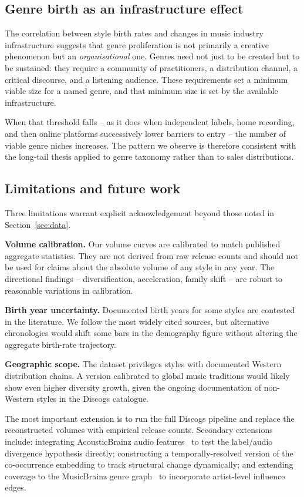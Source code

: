 \documentclass[12pt, a4paper]{article}
\begin{document}
\subsection{Genre birth as an infrastructure effect}

The correlation between style birth rates and changes in music industry
infrastructure suggests that genre proliferation is not primarily
a creative phenomenon but an \emph{organisational} one.
Genres need not just to be created but to be sustained: they require
a community of practitioners, a distribution channel, a critical discourse,
and a listening audience. These requirements set a minimum viable size
for a named genre, and that minimum size is set by the available infrastructure.

When that threshold falls -- as it does when independent labels,
home recording, and then online platforms successively lower barriers
to entry -- the number of viable genre niches increases.
The pattern we observe is therefore consistent with the long-tail
thesis applied to genre taxonomy rather than to sales distributions.

\subsection{Limitations and future work}

Three limitations warrant explicit acknowledgement beyond those noted
in Section~\ref{sec:data}.

\textbf{Volume calibration.} Our volume curves are calibrated to match
published aggregate statistics. They are not derived from raw release counts
and should not be used for claims about the absolute volume of any style
in any year. The directional findings -- diversification, acceleration,
family shift -- are robust to reasonable variations in calibration.

\textbf{Birth year uncertainty.} Documented birth years for some styles
are contested in the literature. We follow the most widely cited sources,
but alternative chronologies would shift some bars in the demography
figure without altering the aggregate birth-rate trajectory.

\textbf{Geographic scope.} The dataset privileges styles with documented
Western distribution chains. A version calibrated to global music traditions
would likely show even higher diversity growth, given the ongoing documentation
of non-Western styles in the Discogs catalogue.

The most important extension is to run the full Discogs pipeline
and replace the reconstructed volumes with empirical release counts.
Secondary extensions include: integrating AcousticBrainz
audio features~\citep{bogdanov2019acousticbrainz} to test the
label/audio divergence hypothesis directly; constructing a
temporally-resolved version of the co-occurrence embedding to track
structural change dynamically; and extending coverage to the
MusicBrainz genre graph~\citep{musicbrainz2024} to incorporate
artist-level influence edges.
\end{document}
